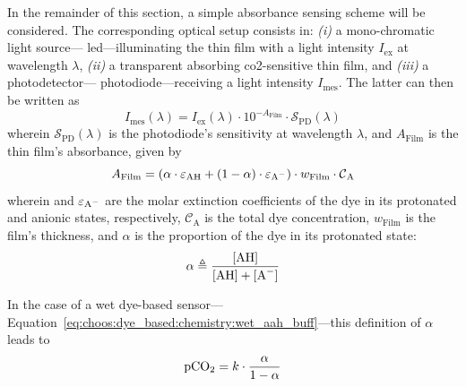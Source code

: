 In the remainder of this section, a simple absorbance sensing scheme will be considered. The corresponding optical setup consists in: \textit{(i)} a mono-chromatic light source---\eg{} \gls{led}---illuminating the thin film with a light intensity $I_\text{ex}$ at wavelength $\lambda$, \textit{(ii)} a transparent absorbing \gls{co2}-sensitive thin film, and \textit{(iii)} a photodetector---\eg{} photodiode---receiving a light intensity $I_\text{mes}$. The latter can then be written as
\begin{equation}\label{eq:choos:dye_based:chemistry:bl_simple_abs}
	I_\text{mes}(\lambda) = I_\text{ex}(\lambda) \cdot 10^{-A_\text{Film}} \cdot \mathcal{S}_\text{PD}(\lambda)
\end{equation}
wherein $\mathcal{S}_\text{PD}(\lambda)$ is the photodiode's sensitivity at wavelength $\lambda$, and $A_\text{Film}$ is the thin film's absorbance, given by
\begin{equation}
	A_\text{Film} = \left( \alpha \cdot \ce{ \varepsilon_{AH}} + (1-\alpha) \cdot \ce{\varepsilon_{A^-}} \right) \cdot w_\text{Film} \cdot \ce{\mathcal{C}_{A} }
\end{equation}
wherein  and $\ce{\varepsilon_{A^-}}$ are the molar extinction coefficients of the dye in its protonated and anionic states, respectively, $\mathcal{C}_\text{A}$ is the total dye concentration, $w_\text{Film}$ is the film's thickness, and $\alpha$ is the proportion of the dye in its protonated state:
\begin{equation}
	\alpha \triangleq \ce{\frac{[AH]}{[AH] + [A^-]}}
\end{equation}

In the case of a wet dye-based sensor---Equation~\ref{eq:choos:dye_based:chemistry:wet_aah_buff}---this definition of $\alpha$ leads to
\begin{equation}\label{eq:choos:dye_based:chemistry:pco2_alpha}
	\ce{pCO_2} = k \cdot \frac{\alpha}{1 - \alpha}
\end{equation}

